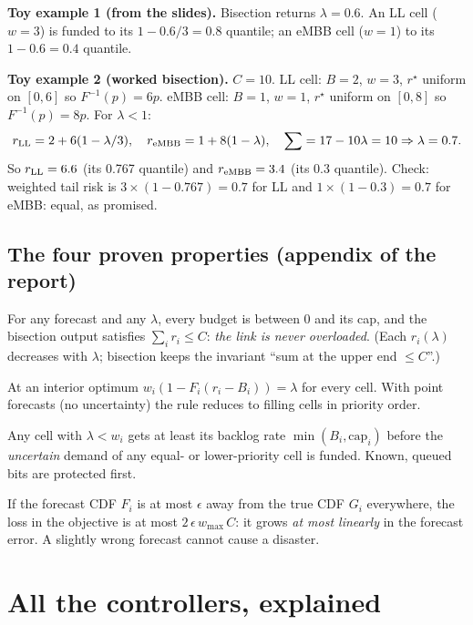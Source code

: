 \documentclass[11pt,a4paper]{article}
\newcommand{\rstar}{r^\star}
\begin{document}
\textbf{Toy example 1 (from the slides).} Bisection returns $\lambda = 0.6$. An LL cell ($w = 3$) is funded to its $1 - 0.6/3 = 0.8$ quantile; an eMBB cell ($w = 1$) to its $1 - 0.6 = 0.4$ quantile.

\textbf{Toy example 2 (worked bisection).} $C = 10$. LL cell: $B = 2$, $w = 3$, $\rstar$ uniform on $[0,6]$ so $F^{-1}(p) = 6p$. eMBB cell: $B = 1$, $w = 1$, $\rstar$ uniform on $[0,8]$ so $F^{-1}(p) = 8p$. For $\lambda < 1$:
\[
  r_{\rm LL} = 2 + 6(1 - \lambda/3),\quad r_{\rm eMBB} = 1 + 8(1-\lambda),\quad
  \sum = 17 - 10\lambda = 10 \Rightarrow \lambda = 0.7 .
\]
So $r_{\rm LL} = 6.6$ (its 0.767 quantile) and $r_{\rm eMBB} = 3.4$ (its 0.3 quantile). Check: weighted tail risk is $3\times(1-0.767) = 0.7$ for LL and $1\times(1-0.3) = 0.7$ for eMBB: equal, as promised.

\subsection{The four proven properties (appendix of the report)}

\begin{description}[leftmargin=0.5cm,style=nextline]
  \item[P1 Feasibility] For any forecast and any $\lambda$, every budget is between 0 and its cap, and the bisection output satisfies $\sum_i r_i \le C$: \emph{the link is never overloaded}. (Each $r_i(\lambda)$ decreases with $\lambda$; bisection keeps the invariant ``sum at the upper end $\le C$''.)
  \item[P2 Equal weighted tail probability] At an interior optimum $w_i(1 - F_i(r_i - B_i)) = \lambda$ for every cell. With point forecasts (no uncertainty) the rule reduces to filling cells in priority order.
  \item[P3 Backlog first] Any cell with $\lambda < w_i$ gets at least its backlog rate $\min(B_i,\mathrm{cap}_i)$ before the \emph{uncertain} demand of any equal- or lower-priority cell is funded. Known, queued bits are protected first.
  \item[P4 Robustness to miscalibration] If the forecast CDF $F_i$ is at most $\epsilon$ away from the true CDF $G_i$ everywhere, the loss in the objective is at most $2\,\epsilon\,w_{\max}\,C$: it grows \emph{at most linearly} in the forecast error. A slightly wrong forecast cannot cause a disaster.
\end{description}

\section{All the controllers, explained}
\end{document}
